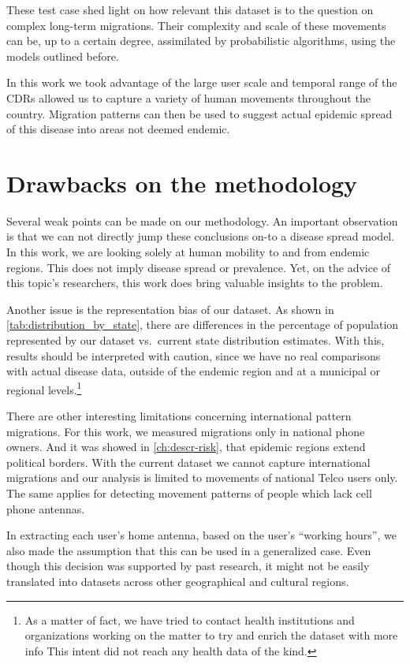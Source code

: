These test case shed light on how relevant this dataset is to the question on complex long-term migrations.
Their complexity and scale of these movements can be, up to a certain degree, assimilated by probabilistic algorithms, using the models outlined before.


In this work we took advantage of the large user scale and temporal range of the CDRs allowed us to capture a variety of human movements throughout the country.
Migration patterns can then be used to suggest actual epidemic spread of this disease into areas not deemed endemic.




\section{Drawbacks on the methodology}

Several weak points can be made on our methodology.
An important observation is that we can not directly jump these conclusions on-to a disease spread model.
In this work, we are looking solely at human mobility to and from endemic regions.
This does not imply disease spread or prevalence.
Yet, on the advice of this topic's researchers, this work does bring valuable insights to the problem.


Another issue is the representation bias of our dataset.
As shown in \cref{tab:distribution_by_state}, there are differences in the percentage of population represented by our dataset vs.\ current state distribution estimates.
With this, results should be interpreted with caution, since we have no real comparisons with actual disease data, outside of the endemic region and at a municipal or regional levels.\footnote{As a matter of fact, we have tried to contact health institutions and organizations working on the matter to try and enrich the dataset with more info
This intent did not reach any health data of the kind.}

There are other interesting limitations concerning international pattern migrations.
For this work, we measured migrations only in national phone owners.
And it was showed in \cref{ch:descr-risk}, that  epidemic regions extend political borders.
With the current dataset we cannot capture international migrations and our analysis is limited to movements of national Telco users only.
The same applies for detecting movement patterns of people which lack cell phone antennas.

In extracting each user's home antenna, based on the user's ``working hours'', we also made the assumption that this can be used in a generalized case.
Even though this decision was supported by past research, it might not be easily translated into datasets across other geographical and cultural regions.

